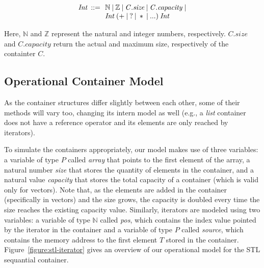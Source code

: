 \documentclass[conference]{IEEEtran}
\begin{document}
{\[\begin{array}{r@{\:\:}c@{\:\:}l}
\mathit{Int}  & ::= & \: \mathbb{N} \: | \: \mathbb{Z} \: | \: \mathit{C.size} \: | \: \mathit{C.capacity} \: | \\
              &     & \: \mathit{Int} \: ( + \: | \: ? \: | \: * \: | \: ...) \: \mathit{Int}  \:
\end{array}
\]

\noindent
Here, $\mathbb{N}$ and $\mathbb{Z}$ represent the natural
and integer numbers, respectively. $\mathit{C.size}$ and $\mathit{C.capacity}$
return the actual and maximum size, respectively of the containter $C$.

}%

\subsection{Operational Container Model}

As the container structures differ slightly
between each other, some of their methods will vary too,
changing its intern model as well (e.g., a \textit{list}
container does not have a reference operator and its elements
are only reached by iterators).

To simulate the containers appropriately, our model makes
use of three variables: a variable of type $P$ called \emph{array} that points
to the first element of the array, a natural number \emph{size} that stores
the quantity of elements in the container, and a natural value \emph{capacity}
that stores the total capacity of a container (which is valid only for vectors).
Note that, as the elements are added in the container (specifically in vectors)
and the size grows, the capacity is doubled every time
the size reaches the existing capacity value. Similarly, iterators are modeled using
two variables: a variable of type $\mathbb{N}$ called \emph{pos},
which contains the index value pointed by the iterator in the container and a
variable of type $P$ called \emph{source}, which contains the memory address to the first
element $T$ stored in the container. Figure~\ref{figure:stl-iterator} gives
an overview of our operational model for the STL sequantial container.
\end{document}
